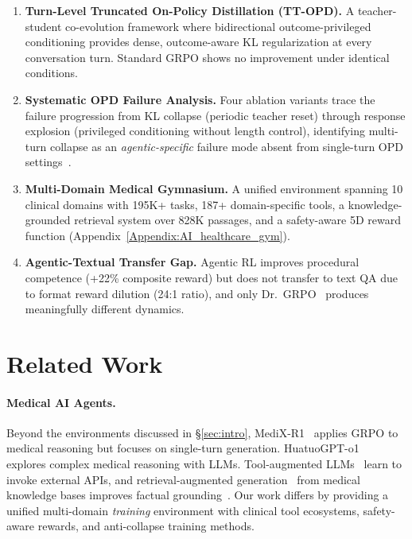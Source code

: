 \documentclass{article}
\begin{document}
\begin{enumerate}[leftmargin=*,itemsep=1pt,topsep=2pt]
    \item \textbf{Turn-Level Truncated On-Policy Distillation (TT-OPD).} A teacher-student co-evolution framework where bidirectional outcome-privileged conditioning provides dense, outcome-aware KL regularization at every conversation turn. Standard GRPO shows no improvement under identical conditions.

    \item \textbf{Systematic OPD Failure Analysis.} Four ablation variants trace the failure progression from KL collapse (periodic teacher reset) through response explosion (privileged conditioning without length control), identifying multi-turn collapse as an \emph{agentic-specific} failure mode absent from single-turn OPD settings~\citep{yang26rlsd, zhao26opsd}.

    \item \textbf{Multi-Domain Medical Gymnasium.} A unified environment spanning 10 clinical domains with 195K+ tasks, 187+ domain-specific tools, a knowledge-grounded retrieval system over 828K passages, and a safety-aware 5D reward function (Appendix~\ref{Appendix:AI_healthcare_gym}).

    \item \textbf{Agentic-Textual Transfer Gap.} Agentic RL improves procedural competence (+22\% composite reward) but does not transfer to text QA due to format reward dilution (24:1 ratio), and only Dr.~GRPO~\citep{liu2025drgrpo} produces meaningfully different dynamics.
\end{enumerate}

\section{Related Work}
\label{sec:related}

\paragraph{Medical AI Agents.}
Beyond the environments discussed in \S\ref{sec:intro}, MediX-R1~\citep{medixr1} applies GRPO to medical reasoning but focuses on single-turn generation. HuatuoGPT-o1~\citep{chen2024huatuogpt} explores complex medical reasoning with LLMs. Tool-augmented LLMs~\citep{schick2024toolformer, qin2023toolllm} learn to invoke external APIs, and retrieval-augmented generation~\citep{lewis2020rag} from medical knowledge bases improves factual grounding~\citep{xiong2024medcpt}. Our work differs by providing a unified multi-domain \emph{training} environment with clinical tool ecosystems, safety-aware rewards, and anti-collapse training methods.
\end{document}
